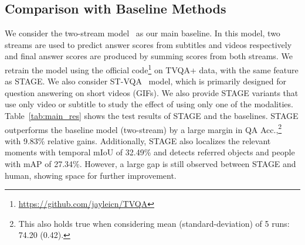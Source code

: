 \documentclass[11pt,a4paper]{article}
\begin{document}
\begin{table}[!t]
\centering
\small
{}
\caption{TVQA+ test set results.}
\label{tab:main_res}
\end{table}


\subsection{Comparison with Baseline Methods}
We consider the two-stream model~\cite{lei2018tvqa} as our main baseline. 
In this model, two streams are used to predict answer scores from subtitles and videos respectively and final answer scores are produced by summing scores from both streams. 
We retrain the model using the official code\footnote{\url{https://github.com/jayleicn/TVQA}} on TVQA+ data, with the same feature as STAGE. 
We also consider ST-VQA~\cite{Jang2017TGIFQATS} model, which is primarily designed for question answering on short videos (GIFs).
We also provide STAGE variants that use only video or subtitle to study the effect of using only one of the modalities.
Table~\ref{tab:main_res} shows the test results of STAGE and the baselines. STAGE outperforms the baseline model (two-stream) by a large margin in QA Acc.,\footnote{This also holds true when considering mean (standard-deviation) of 5 runs: 74.20 (0.42).} with 9.83\% relative gains.
Additionally, STAGE also localizes the relevant moments with temporal mIoU of 32.49\% and detects referred objects and people with mAP of 27.34\%. 
However, a large gap is still observed between STAGE and human, showing space for further improvement.
\end{document}
